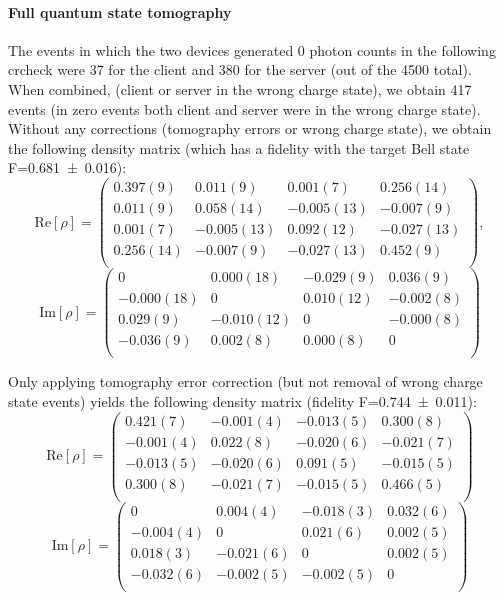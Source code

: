\paragraph{Full quantum state tomography}

The events in which the two devices generated \num{0} photon counts in the following
\acrshort{crcheck} were \num{37} for the client and \num{380} for the server (out of the \num{4500}
total). When combined, (client or server in the wrong charge state), we obtain \num{417} events (in
zero events both client and server were in the wrong charge state). Without any corrections
(tomography errors or wrong charge state), we obtain the following density matrix (which has a
fidelity with the target Bell state F=\num{0.681(16)}):
\[
    \mathrm{Re}[\rho] = \begin{pmatrix}
        0.397(9)  & 0.011(9)   & 0.001(7)   & 0.256(14)  \\
        0.011(9)  & 0.058(14)  & -0.005(13) & -0.007(9)  \\
        0.001(7)  & -0.005(13) & 0.092(12)  & -0.027(13) \\
        0.256(14) & -0.007(9)  & -0.027(13) & 0.452(9)   \\
    \end{pmatrix},
\]
\[
    \mathrm{Im}[\rho] = \begin{pmatrix}
        0          & 0.000(18)  & -0.029(9) & 0.036(9)  \\
        -0.000(18) & 0          & 0.010(12) & -0.002(8) \\
        0.029(9)   & -0.010(12) & 0         & -0.000(8) \\
        -0.036(9)  & 0.002(8)   & 0.000(8)  & 0         \\
    \end{pmatrix}
\]

Only applying tomography error correction (but not removal of wrong charge state events) yields the
following density matrix (fidelity F=\num{0.744(11)}):
\[
    \mathrm{Re}[\rho] = \begin{pmatrix}
        0.421(7)  & -0.001(4) & -0.013(5) & 0.300(8)  \\
        -0.001(4) & 0.022(8)  & -0.020(6) & -0.021(7) \\
        -0.013(5) & -0.020(6) & 0.091(5)  & -0.015(5) \\
        0.300(8)  & -0.021(7) & -0.015(5) & 0.466(5)  \\
    \end{pmatrix}
\]
\[
    \mathrm{Im}[\rho] = \begin{pmatrix}
        0         & 0.004(4)  & -0.018(3) & 0.032(6) \\
        -0.004(4) & 0         & 0.021(6)  & 0.002(5) \\
        0.018(3)  & -0.021(6) & 0         & 0.002(5) \\
        -0.032(6) & -0.002(5) & -0.002(5) & 0        \\
    \end{pmatrix}
\]


